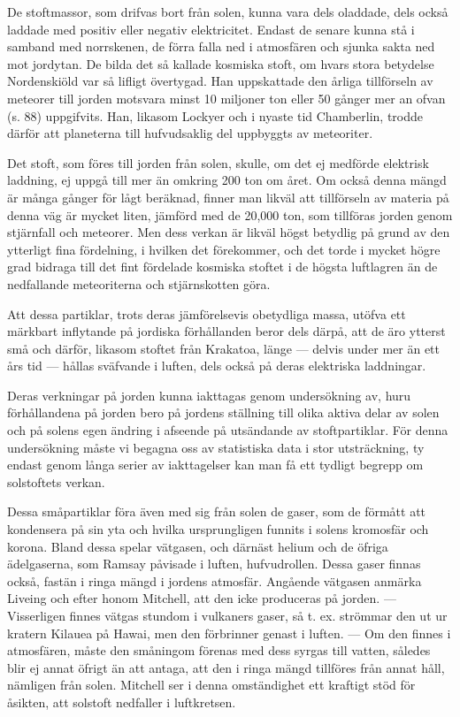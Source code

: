 \documentclass[a4paper, 12pt, oneside, swedish]{article}
\begin{document}
De stoftmassor, som drifvas bort från solen, kunna vara dels oladdade, dels också laddade med positiv eller negativ elektricitet. Endast de senare kunna stå i samband med norrskenen, de förra falla ned i atmosfären och sjunka sakta ned mot jordytan. De bilda det så kallade kosmiska stoft, om hvars stora betydelse Nordenskiöld var så lifligt övertygad. Han uppskattade den årliga tillförseln av meteorer till jorden motsvara minst 10 miljoner ton eller 50 gånger mer an ofvan (s. 88) uppgifvits. Han, likasom Lockyer och i nyaste tid Chamberlin, trodde därför att planeterna till hufvudsaklig del uppbyggts av meteoriter.

Det stoft, som föres till jorden från solen, skulle, om det ej medförde elektrisk laddning, ej uppgå till mer än omkring 200 ton om året. Om också denna mängd är många gånger för lågt beräknad, finner man likväl att tillförseln av materia på denna väg är mycket liten, jämförd med de 20,000 ton, som tillföras jorden genom stjärnfall och meteorer. Men dess verkan är likväl högst betydlig på grund av den ytterligt fina fördelning, i hvilken det förekommer, och det torde i mycket högre grad bidraga till det fint fördelade kosmiska stoftet i de högsta luftlagren än de nedfallande meteoriterna och stjärnskotten göra.

Att dessa partiklar, trots deras jämförelsevis obetydliga massa, utöfva ett märkbart inflytande på jordiska förhållanden beror dels därpå, att de äro ytterst små och därför, likasom stoftet från Krakatoa, länge --- delvis under mer än ett års tid --- hållas sväfvande i luften, dels också på deras elektriska laddningar.

Deras verkningar på jorden kunna iakttagas genom undersökning av, huru förhållandena på jorden bero på jordens ställning till olika aktiva delar av solen och på solens egen ändring i afseende på utsändande av stoftpartiklar. För denna undersökning måste vi begagna oss av statistiska data i stor utsträckning, ty endast genom långa serier av iakttagelser kan man få ett tydligt begrepp om solstoftets verkan.

Dessa småpartiklar föra även med sig från solen de gaser, som de förmått att kondensera på sin yta och hvilka ursprungligen funnits i solens kromosfär och korona. Bland dessa spelar vätgasen, och därnäst helium och de öfriga ädelgaserna, som Ramsay påvisade i luften, hufvudrollen. Dessa gaser finnas också, fastän i ringa mängd i jordens atmosfär. Angående vätgasen anmärka Liveing och efter honom Mitchell, att den icke produceras på jorden. --- Visserligen finnes vätgas stundom i vulkaners gaser, så t. ex. strömmar den ut ur kratern Kilauea på Hawai, men den förbrinner genast i luften. --- Om den finnes i atmosfären, måste den småningom förenas med dess syrgas till vatten, således blir ej annat öfrigt än att antaga, att den i ringa mängd tillföres från annat håll, nämligen från solen. Mitchell ser i denna omständighet ett kraftigt stöd för åsikten, att solstoft nedfaller i luftkretsen.
\end{document}
